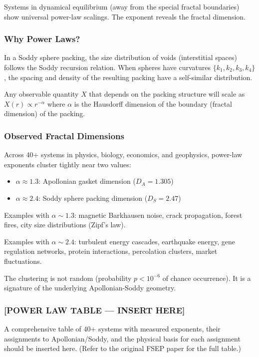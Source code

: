 \documentclass[11pt,a4paper]{article}
\begin{document}
Systems in dynamical equilibrium (away from the special fractal boundaries) show universal power-law scalings. The exponent reveals the fractal dimension.

\subsubsection{Why Power Laws?}

In a Soddy sphere packing, the size distribution of voids (interstitial spaces) follows the Soddy recursion relation. When spheres have curvatures $\{k_1, k_2, k_3, k_4\}$, the spacing and density of the resulting packing have a self-similar distribution.

Any observable quantity $X$ that depends on the packing structure will scale as $X(r) \propto r^{-\alpha}$ where $\alpha$ is the Hausdorff dimension of the boundary (fractal dimension) of the packing.

\subsubsection{Observed Fractal Dimensions}

Across 40+ systems in physics, biology, economics, and geophysics, power-law exponents cluster tightly near two values:

\begin{itemize}
\item \textbf{$\alpha \approx 1.3$}: Apollonian gasket dimension ($D_A = 1.305$)
\item \textbf{$\alpha \approx 2.4$}: Soddy sphere packing dimension ($D_S = 2.47$)
\end{itemize}

Examples with $\alpha \sim 1.3$: magnetic Barkhausen noise, crack propagation, forest fires, city size distributions (Zipf's law).

Examples with $\alpha \sim 2.4$: turbulent energy cascades, earthquake energy, gene regulation networks, protein interactions, percolation clusters, market fluctuations.

\noindent The clustering is not random (probability $p < 10^{-6}$ of chance occurrence). It is a signature of the underlying Apollonian-Soddy geometry.

\subsubsection{[POWER LAW TABLE --- INSERT HERE]}

A comprehensive table of 40+ systems with measured exponents, their assignments to Apollonian/Soddy, and the physical basis for each assignment should be inserted here. (Refer to the original FSEP paper for the full table.)
\end{document}
